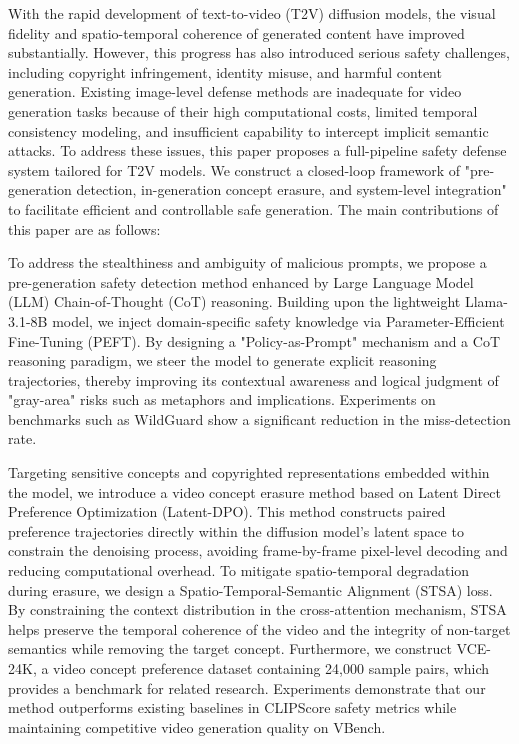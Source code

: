With the rapid development of text-to-video (T2V) diffusion models, the visual fidelity and spatio-temporal coherence of generated content have improved substantially. However, this progress has also introduced serious safety challenges, including copyright infringement, identity misuse, and harmful content generation. Existing image-level defense methods are inadequate for video generation tasks because of their high computational costs, limited temporal consistency modeling, and insufficient capability to intercept implicit semantic attacks. To address these issues, this paper proposes a full-pipeline safety defense system tailored for T2V models. We construct a closed-loop framework of "pre-generation detection, in-generation concept erasure, and system-level integration" to facilitate efficient and controllable safe generation. The main contributions of this paper are as follows:

To address the stealthiness and ambiguity of malicious prompts, we propose a pre-generation safety detection method enhanced by Large Language Model (LLM) Chain-of-Thought (CoT) reasoning. Building upon the lightweight Llama-3.1-8B model, we inject domain-specific safety knowledge via Parameter-Efficient Fine-Tuning (PEFT). By designing a "Policy-as-Prompt" mechanism and a CoT reasoning paradigm, we steer the model to generate explicit reasoning trajectories, thereby improving its contextual awareness and logical judgment of "gray-area" risks such as metaphors and implications. Experiments on benchmarks such as WildGuard show a significant reduction in the miss-detection rate.

Targeting sensitive concepts and copyrighted representations embedded within the model, we introduce a video concept erasure method based on Latent Direct Preference Optimization (Latent-DPO). This method constructs paired preference trajectories directly within the diffusion model's latent space to constrain the denoising process, avoiding frame-by-frame pixel-level decoding and reducing computational overhead. To mitigate spatio-temporal degradation during erasure, we design a Spatio-Temporal-Semantic Alignment (STSA) loss. By constraining the context distribution in the cross-attention mechanism, STSA helps preserve the temporal coherence of the video and the integrity of non-target semantics while removing the target concept. Furthermore, we construct VCE-24K, a video concept preference dataset containing 24,000 sample pairs, which provides a benchmark for related research. Experiments demonstrate that our method outperforms existing baselines in CLIPScore safety metrics while maintaining competitive video generation quality on VBench.

